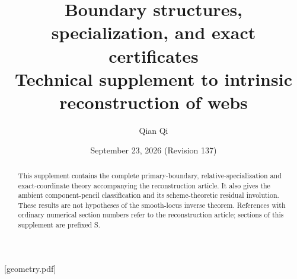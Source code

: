 
[geometry.pdf]
\renewcommand{\thesection}{S\arabic{section}}

\title[Boundary structures and exact certificates]{Boundary structures, specialization, and exact certificates\\Technical supplement to intrinsic reconstruction of webs}
\author{Qian Qi}
\date{September 23, 2026 (Revision 137)}
\begin{abstract}This supplement contains the complete primary-boundary,
relative-specialization and exact-coordinate theory accompanying the
reconstruction article.  It also gives the ambient component-pencil
classification and its scheme-theoretic residual involution.
These results are not hypotheses of the smooth-locus inverse theorem.
References with ordinary numerical section numbers refer to the
reconstruction article; sections of this supplement are prefixed S.
\end{abstract}
\maketitle
\enlargethispage{3pt}
\tableofcontents


















